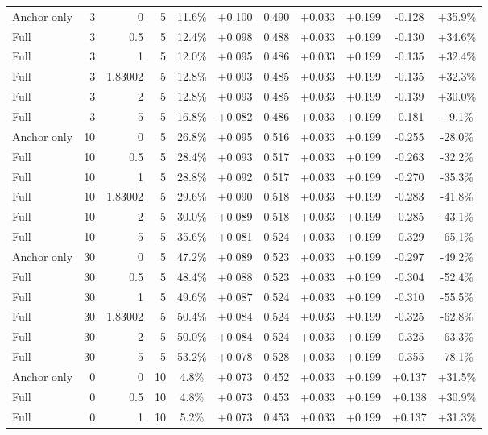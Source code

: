 \begin{table}[htbp]
\begin{tabular}{lrrrccccccc}
Anchor only & 3 & 0 & 5 & 11.6\% & +0.100 & 0.490 & +0.033 & +0.199 & -0.128 & +35.9\% \\
Full & 3 & 0.5 & 5 & 12.4\% & +0.098 & 0.488 & +0.033 & +0.199 & -0.130 & +34.6\% \\
Full & 3 & 1 & 5 & 12.0\% & +0.095 & 0.486 & +0.033 & +0.199 & -0.135 & +32.4\% \\
Full & 3 & 1.83002 & 5 & 12.8\% & +0.093 & 0.485 & +0.033 & +0.199 & -0.135 & +32.3\% \\
Full & 3 & 2 & 5 & 12.8\% & +0.093 & 0.485 & +0.033 & +0.199 & -0.139 & +30.0\% \\
Full & 3 & 5 & 5 & 16.8\% & +0.082 & 0.486 & +0.033 & +0.199 & -0.181 & +9.1\% \\
Anchor only & 10 & 0 & 5 & 26.8\% & +0.095 & 0.516 & +0.033 & +0.199 & -0.255 & -28.0\% \\
Full & 10 & 0.5 & 5 & 28.4\% & +0.093 & 0.517 & +0.033 & +0.199 & -0.263 & -32.2\% \\
Full & 10 & 1 & 5 & 28.8\% & +0.092 & 0.517 & +0.033 & +0.199 & -0.270 & -35.3\% \\
Full & 10 & 1.83002 & 5 & 29.6\% & +0.090 & 0.518 & +0.033 & +0.199 & -0.283 & -41.8\% \\
Full & 10 & 2 & 5 & 30.0\% & +0.089 & 0.518 & +0.033 & +0.199 & -0.285 & -43.1\% \\
Full & 10 & 5 & 5 & 35.6\% & +0.081 & 0.524 & +0.033 & +0.199 & -0.329 & -65.1\% \\
Anchor only & 30 & 0 & 5 & 47.2\% & +0.089 & 0.523 & +0.033 & +0.199 & -0.297 & -49.2\% \\
Full & 30 & 0.5 & 5 & 48.4\% & +0.088 & 0.523 & +0.033 & +0.199 & -0.304 & -52.4\% \\
Full & 30 & 1 & 5 & 49.6\% & +0.087 & 0.524 & +0.033 & +0.199 & -0.310 & -55.5\% \\
Full & 30 & 1.83002 & 5 & 50.4\% & +0.084 & 0.524 & +0.033 & +0.199 & -0.325 & -62.8\% \\
Full & 30 & 2 & 5 & 50.0\% & +0.084 & 0.524 & +0.033 & +0.199 & -0.325 & -63.3\% \\
Full & 30 & 5 & 5 & 53.2\% & +0.078 & 0.528 & +0.033 & +0.199 & -0.355 & -78.1\% \\
Anchor only & 0 & 0 & 10 & 4.8\% & +0.073 & 0.452 & +0.033 & +0.199 & +0.137 & +31.5\% \\
Full & 0 & 0.5 & 10 & 4.8\% & +0.073 & 0.453 & +0.033 & +0.199 & +0.138 & +30.9\% \\
Full & 0 & 1 & 10 & 5.2\% & +0.073 & 0.453 & +0.033 & +0.199 & +0.137 & +31.3\% \\

\end{tabular}
\end{table}

